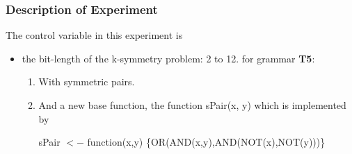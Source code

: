 \begin{frame}
\frametitle{
Description of Experiment
}
The control variable in this experiment is
\begin{itemize}
\item the bit-length of the k-symmetry problem: 2 to 12.
       for grammar {\bf T5}:
\begin{enumerate}
\item With symmetric pairs.
\item And a new base function,
       the function sPair(x, y) which is implemented by
 
 sPair $<-$ function(x,y) \{OR(AND(x,y),AND(NOT(x),NOT(y)))\}
\end{enumerate}
\end{itemize}
\end{frame}